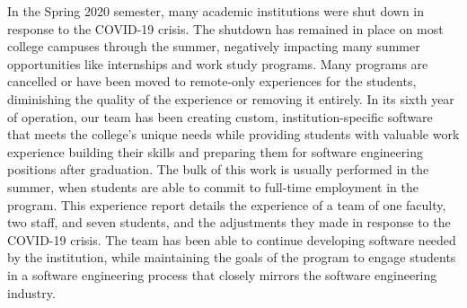 In the Spring 2020 semester, many academic institutions were shut down in response to the COVID-19 crisis.
The shutdown has remained in place on most college campuses through the summer, negatively impacting many summer opportunities like internships and work study programs. Many programs are cancelled or have been moved to remote-only experiences for the students, diminishing the quality of the experience or removing it entirely. In its sixth year of operation, our team has been creating custom, institution-specific software that meets the college's unique needs while providing students with valuable work experience building their skills and preparing them for software engineering positions after graduation. The bulk of this work is usually performed in the summer, when students are able to commit to full-time employment in the program. This experience report details the experience of a team of one faculty, two staff, and seven students, and the adjustments they made in response to the COVID-19 crisis. The team has been able to continue developing software needed by the institution, while maintaining the goals of the program to engage students in a software engineering process that closely mirrors the software engineering industry.
